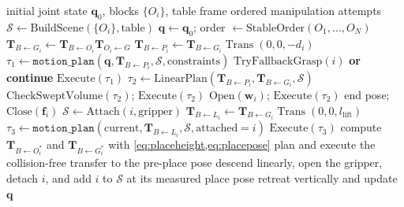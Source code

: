 \documentclass{article}
\begin{document}
\begin{algorithm}[t]
\caption{Collision-aware block stacking}
\label{alg:stack}
\begin{algorithmic}[1]
\REQUIRE initial joint state $\mathbf{q}_0$, blocks $\{O_i\}$, table frame
\ENSURE ordered manipulation attempts
\STATE $\mathcal{S}\leftarrow\mathrm{BuildScene}(\{O_i\},\text{table})$
\STATE $\mathbf{q}\leftarrow\mathbf{q}_0$; order $\leftarrow\mathrm{StableOrder}(O_1,\ldots,O_N)$
  \STATE $\mathbf{T}_{B\leftarrow G_i}\leftarrow
    \mathbf{T}_{B\leftarrow O_i}\mathbf{T}_{O_i\leftarrow G}$
  \STATE $\mathbf{T}_{B\leftarrow P_i}\leftarrow
    \mathbf{T}_{B\leftarrow G_i}\operatorname{Trans}(0,0,-d_i)$
\STATE $\tau_1\leftarrow\texttt{motion\_plan}
    (\mathbf{q},\mathbf{T}_{B\leftarrow P_i},\mathcal{S},\mathrm{constraints})$
    \STATE $\mathrm{TryFallbackGrasp}(i)$ \textbf{or continue}
  \ENDIF
  \STATE $\mathrm{Execute}(\tau_1)$
  \STATE $\tau_2\leftarrow\mathrm{LinearPlan}
    (\mathbf{T}_{B\leftarrow P_i},\mathbf{T}_{B\leftarrow G_i},\mathcal{S})$
  \STATE $\mathrm{CheckSweptVolume}(\tau_2)$; $\mathrm{Execute}(\tau_2)$
  \STATE $\mathrm{Open}(\mathbf{w}_i)$; $\mathrm{Execute}(\tau_2)$ end pose;
    $\mathrm{Close}(\mathbf{f}_i)$
  \STATE $\mathcal{S}\leftarrow\mathrm{Attach}(i,\mathrm{gripper})$
  \STATE $\mathbf{T}_{B\leftarrow L_i}\leftarrow
    \mathbf{T}_{B\leftarrow G_i}\operatorname{Trans}(0,0,l_{\mathrm{lift}})$
\STATE $\tau_3\leftarrow\texttt{motion\_plan}
    (\mathrm{current},\mathbf{T}_{B\leftarrow L_i},\mathcal{S},\mathrm{attached}=i)$
  \STATE $\mathrm{Execute}(\tau_3)$
  \STATE compute $\mathbf{T}_{B\leftarrow O_i^{*}}$ and
    $\mathbf{T}_{B\leftarrow G_i^{*}}$ with \cref{eq:placeheight,eq:placepose}
  \STATE plan and execute the collision-free transfer to the pre-place pose
  \STATE descend linearly, open the gripper, detach $i$, and add $i$ to
    $\mathcal{S}$ at its measured place pose
  \STATE retreat vertically and update $\mathbf{q}$
\ENDFOR
\end{algorithmic}
\end{algorithm}
\end{document}

